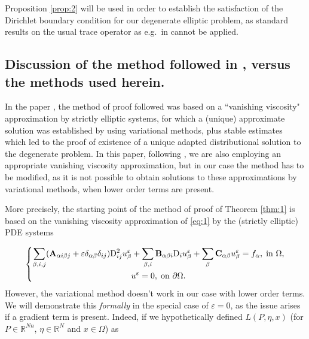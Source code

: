 \documentclass{amsart}
\numberwithin{equation}{section}
\numberwithin{thm}{section}
\theoremstyle{definition}
\renewcommand{\:}{\!:\!} %
\newcommand{\e}{\varepsilon}
\renewcommand{\^}[1]{^{#1}_{\phantom{l}}}
\begin{document}
Proposition \ref{prop:2} will be used in order to establish the satisfaction of the Dirichlet boundary condition for our degenerate elliptic problem, as standard results on the usual trace operator as e.g.\ in \cite{EG} cannot be applied.



\subsection*{Discussion of the method followed in  \cite{nikos1}, versus the methods used herein.} \label{Variationally} In the paper \cite{nikos1}, the method of proof followed was based on a ``vanishing viscosity" approximation by strictly elliptic systems, for which a (unique) approximate solution was established by using variational methods, plus stable estimates which led to the proof of existence of a unique adapted distributional solution to the degenerate problem. In this paper, following \cite{nikos1}, we are also employing an appropriate vanishing viscosity approximation, but in our case the method has to be modified, as it is not possible to obtain solutions to these approximations by variational methods, when lower order terms are present.

More precisely, the starting point of the method of proof of Theorem \ref{thm:1} is based on the vanishing viscosity approximation of \eqref{eq:1} by the (strictly elliptic) PDE systems

\begin{equation} \label{eq:1s}
\left\{
\begin{gathered}
			\hfil \sum_{\beta, i, j} (\mathbf{A}_{\alpha i \beta j} + \varepsilon \delta_{\alpha \beta} \delta_{ij})\mathrm{D}_{ij}^{2}u^{\varepsilon}_{\beta} + \sum_{\beta, i} \mathbf{B}_{\alpha \beta i}\mathrm{D}_{i}u^{\varepsilon}_{\beta} + \sum_{\beta} \mathbf{C}_{\alpha \beta}u^{\varepsilon}_{\beta} = f_{\alpha}, \hspace{0.1cm} \text{in $\Omega$}, \\
            u^{\varepsilon} = 0, \hspace{0.1cm} \text{on $\partial \Omega$.}
		 \end{gathered}
		 \right.
\end{equation}
However, the variational method doesn't work in our case with lower order terms. We will demonstrate this \emph{formally} in the special case of $\e=0$, as the issue arises if a gradient term is present. Indeed, if we hypothetically defined $L(P, \eta, x)$ (for $P \in \mathbb{R}^{Nn}$, $\eta \in \mathbb{R}^N$ and $x \in \Omega$) as
\end{document}
